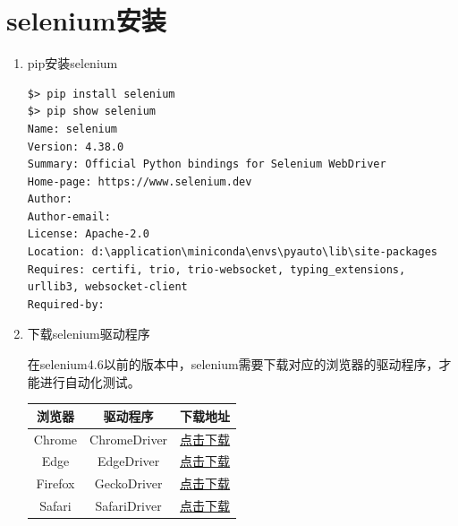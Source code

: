 \section{selenium安装}
\begin{enumerate}[label=\arabic*)]
    \item pip安装selenium
\begin{lstlisting}[style=demostyle,numbers=none]
$> pip install selenium
$> pip show selenium
Name: selenium
Version: 4.38.0
Summary: Official Python bindings for Selenium WebDriver
Home-page: https://www.selenium.dev
Author:
Author-email:
License: Apache-2.0
Location: d:\application\miniconda\envs\pyauto\lib\site-packages
Requires: certifi, trio, trio-websocket, typing_extensions, urllib3, websocket-client
Required-by:
\end{lstlisting}

    \item 下载selenium驱动程序
 
    在selenium4.6以前的版本中，selenium需要下载对应的浏览器的驱动程序，才能进行自动化测试。
    \begin{table}
        \centering
        \begin{tabular}{|c|c|c|}
            \hline
            浏览器 & 驱动程序 & 下载地址 \\
            \hline
            Chrome & ChromeDriver & \href{https://sites.google.com/chromium.org/driver/}{点击下载} \\
            \hline
            Edge & EdgeDriver & \href{https://developer.microsoft.com/en-us/microsoft-edge/tools/webdriver/}{点击下载} \\
            \hline
            Firefox & GeckoDriver & \href{https://github.com/mozilla/geckodriver/releases}{点击下载} \\
            \hline
            Safari & SafariDriver & \href{https://webkit.org/blog/6900/webdriver-support-in-safari-10/}{点击下载} \\
            \hline
        \end{tabular}
    \end{table}
\end{enumerate}

